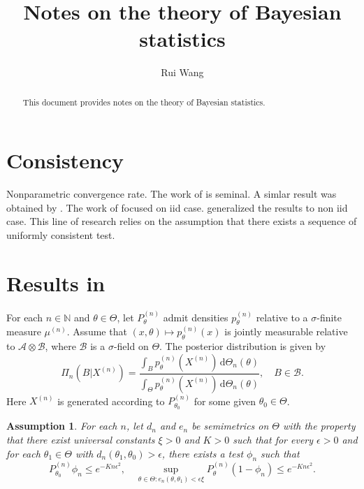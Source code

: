 \documentclass[11pt]{article}
\theoremstyle{plain}
\newtheorem{assumption}{\quad\quad Assumption}
\theoremstyle{definition}
\theoremstyle{remark}
\begin{document}
\title{Notes on the theory of Bayesian statistics}

\author{Rui Wang}
\maketitle
\begin{abstract}
    This document provides notes on the theory of Bayesian statistics.
\end{abstract}

\section{Consistency}

Nonparametric convergence rate.
The work of \cite{ghosal2000} is seminal.
A simlar result was obtained by \cite{Shen2001Rates}.
The work of \cite{ghosal2000} focused on iid case.
\cite{vaart2007convergence} generalized the results to non iid case.
This line of research relies on the assumption that there exists a sequence of uniformly consistent test.

\section{Results in \cite{vaart2007convergence}}
For each $n \in \mathbb N$ and $\theta\in \Theta$, let $P_{\theta}^{(n)}$ admit densities $p_\theta^{(n)}$ relative to a $\sigma$-finite measure $\mu^{(n)}$.
Assume that $(x,\theta) \mapsto p_{\theta}^{(n)}(x)$ is jointly measurable relative to $\mathscr A \otimes \mathscr B$, where $\mathscr B$ is a $\sigma$-field on $\Theta$.
The posterior distribution is given by
\begin{equation*}
    \Pi_n (B| X^{(n)}) = \frac{
        \int_B p_{\theta}^{(n)} (X^{(n)}) \,\mathrm d  \Theta_n(\theta)
    }{
        \int_{\Theta} p_{\theta}^{(n)} (X^{(n)}) \,\mathrm d  \Theta_n(\theta)
    } 
    ,\quad
    B \in \mathscr B.
\end{equation*}
Here $X^{(n)}$ is generated according to $P_{\theta_0}^{(n)}$ for some given $\theta_0 \in \Theta$.

\begin{assumption}
For each $n$, let $d_n$ and $e_n$ be semimetrics on $\Theta$ with the property that there exist universal constants $\xi >0$ and $K>0$ such that for every $\epsilon > 0$ and for each $\theta_1 \in \Theta$ with $d_n (\theta_1,\theta_0) > \epsilon$, there exists a test $\phi_n$ such that
\begin{equation*}
    P_{\theta_0}^{(n)} \phi_n \leq e^{-K n \epsilon^2},
    \quad
    \sup_{\theta\in \Theta: e_n (\theta,\theta_1)<\epsilon \xi}
    P_{\theta}^{(n)} (1-\phi_n) \leq e^{-K n \epsilon^2}.
\end{equation*}
    \label{assumption:test}
\end{assumption}
\end{document}
